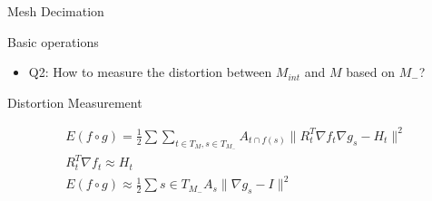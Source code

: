 \documentclass{beamer}
\begin{document}
\begin{frame}{Mesh Decimation}
\begin{block}{Basic operations}
\end{block}
\begin{itemize}
\item Q2: How to measure the distortion between $M_{int}$ and $M$ based on $M_{-}$?
\end{itemize}
\end{frame}


\begin{frame}{Distortion Measurement}
\begin{block}{}
\begin{block}{}
\begin{eqnarray}
E(f\circ g) = \frac{1}{2}\sum\sum_{t\in T_M,s\in T_{M_{-}}} A_{t\cap f(s)}\|R^T_t\nabla f_t \nabla g_s - H_t\|^2\\
R_t^T\nabla f_t\approx H_t\\
E(f\circ g) \approx \frac{1}{2}\sum{s\in T_{M_{-}}} A_{s}\|\nabla g_s - I\|^2
\end{eqnarray}
\end{block}
\end{block}
\end{frame}
\end{document}
